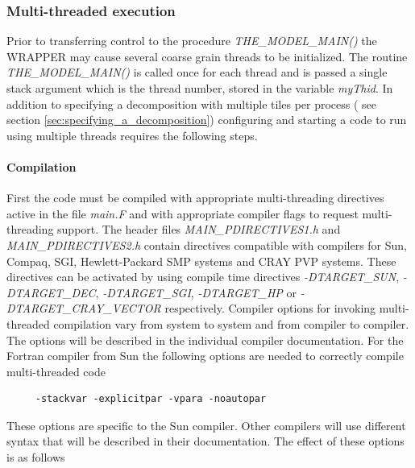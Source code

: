 \subsubsection{Multi-threaded execution}
\label{sec:multi_threaded_execution}
Prior to transferring control to the procedure {\em THE\_MODEL\_MAIN()} the
WRAPPER may cause several coarse grain threads to be initialized. The routine
{\em THE\_MODEL\_MAIN()} is called once for each thread and is passed a single
stack argument which is the thread number, stored in the
variable {\em myThid}. In addition to specifying a decomposition with
multiple tiles per process ( see section \ref{sec:specifying_a_decomposition}) 
configuring and starting a code to run using multiple threads requires the following
steps.\\

\paragraph{Compilation}
First the code must be compiled with appropriate multi-threading directives 
active in the file {\em main.F} and with appropriate compiler flags
to request multi-threading support. The header files 
{\em MAIN\_PDIRECTIVES1.h} and {\em MAIN\_PDIRECTIVES2.h}
contain directives compatible with compilers for Sun, Compaq, SGI,
Hewlett-Packard SMP systems and CRAY PVP systems. These directives can be 
activated by using compile time
directives {\em -DTARGET\_SUN}, 
{\em -DTARGET\_DEC}, {\em -DTARGET\_SGI}, {\em -DTARGET\_HP}
or {\em -DTARGET\_CRAY\_VECTOR} respectively. Compiler options
for invoking multi-threaded compilation vary from system to system
and from compiler to compiler. The options will be described
in the individual compiler documentation. For the Fortran compiler 
from Sun the following options are needed to correctly compile
multi-threaded code
\begin{verbatim}
     -stackvar -explicitpar -vpara -noautopar
\end{verbatim}
These options are specific to the Sun compiler. Other compilers
will use different syntax that will be described in their
documentation. The effect of these options is as follows
